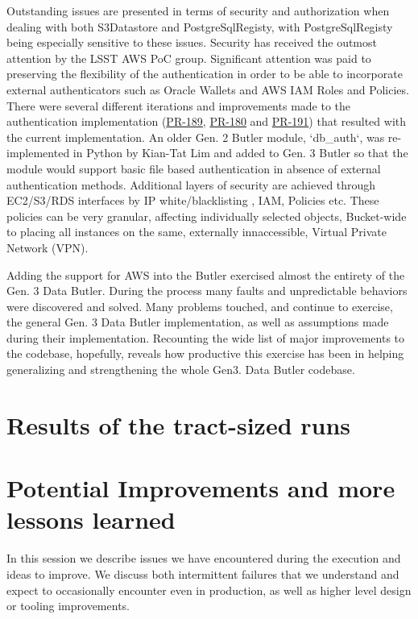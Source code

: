 Outstanding issues are presented in terms of security and authorization when dealing with both S3Datastore and PostgreSqlRegisty, with PostgreSqlRegisty being especially sensitive to these issues. Security has received the outmost attention by the LSST AWS PoC group. Significant attention was paid to preserving the flexibility of the authentication in order to be able to incorporate external authenticators such as Oracle Wallets and AWS IAM Roles and Policies. There were several different iterations and improvements made to the authentication implementation (\href{https://github.com/lsst/daf_butler/pull/189}{PR-189}, \href{https://github.com/lsst/daf_butler/pull/180}{PR-180} and \href{https://github.com/lsst/daf_butler/pull/191}{PR-191}) that resulted with the current implementation. An older Gen. 2 Butler module, `db\_auth`, was re-implemented in Python by Kian-Tat Lim and added to Gen. 3 Butler so that the module would support basic file based authentication in absence of external authentication methods. Additional layers of security are achieved through EC2/S3/RDS interfaces by IP white/blacklisting , IAM, Policies etc. These policies can be very granular, affecting individually selected objects, Bucket-wide to placing all instances on the same, externally innaccessible, Virtual Private Network (VPN).

Adding the support for AWS into the Butler exercised almost the entirety of the Gen. 3 Data Butler. During the process many faults and unpredictable behaviors were discovered and solved. Many problems touched, and continue to exercise, the general Gen. 3 Data Butler implementation, as well as assumptions made during their implementation. Recounting the wide list of major improvements to the codebase, hopefully, reveals how productive this exercise has been in helping generalizing and strengthening the whole Gen3. Data Butler codebase.

\section{Results of the tract-sized runs}



\section{Potential Improvements and more lessons learned} \label{future}

In this session we describe issues we have encountered during the execution and ideas to improve.
We discuss both intermittent failures that we understand and expect to occasionally encounter even in production, as well as higher level design or tooling improvements.

